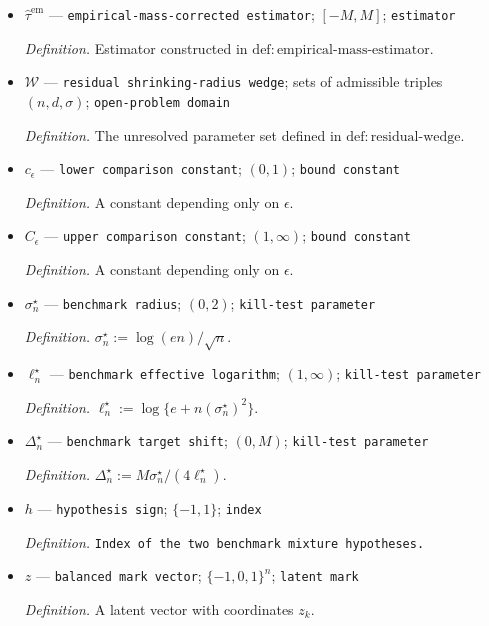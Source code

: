 \documentclass{article}
\begin{document}
\begin{itemize}
  \item \(\widehat\tau^{\mathrm{em}}\) --- \texttt{empirical-\allowbreak{}mass-\allowbreak{}corrected estimator}; \([-M,M]\); \texttt{estimator}
  \par\smallskip\noindent\emph{Definition.} Estimator constructed in \(\mathrm{def:empirical\text{-}mass\text{-}estimator}\).
  \item \(\mathcal W\) --- \texttt{residual shrinking-\allowbreak{}radius wedge}; sets of admissible triples \((n,d,\sigma)\); \texttt{open-\allowbreak{}problem domain}
  \par\smallskip\noindent\emph{Definition.} The unresolved parameter set defined in \(\mathrm{def:residual\text{-}wedge}\).
  \item \(c_{\epsilon}\) --- \texttt{lower comparison constant}; \((0,1)\); \texttt{bound constant}
  \par\smallskip\noindent\emph{Definition.} A constant depending only on \(\epsilon\).
  \item \(C_{\epsilon}\) --- \texttt{upper comparison constant}; \((1,\infty)\); \texttt{bound constant}
  \par\smallskip\noindent\emph{Definition.} A constant depending only on \(\epsilon\).
  \item \(\sigma_n^\star\) --- \texttt{benchmark radius}; \((0,2)\); \texttt{kill-\allowbreak{}test parameter}
  \par\smallskip\noindent\emph{Definition.} \(\sigma_n^\star:=\log(en)/\sqrt n\).
  \item \(\ell_n^\star\) --- \texttt{benchmark effective logarithm}; \((1,\infty)\); \texttt{kill-\allowbreak{}test parameter}
  \par\smallskip\noindent\emph{Definition.} \(\ell_n^\star:=\log\{e+n(\sigma_n^\star)^2\}\).
  \item \(\Delta_n^\star\) --- \texttt{benchmark target shift}; \((0,M)\); \texttt{kill-\allowbreak{}test parameter}
  \par\smallskip\noindent\emph{Definition.} \(\Delta_n^\star:=M\sigma_n^\star/(4\ell_n^\star)\).
  \item \(h\) --- \texttt{hypothesis sign}; \(\{-1,1\}\); \texttt{index}
  \par\smallskip\noindent\emph{Definition.} \texttt{Index of the two benchmark mixture hypotheses.}
  \item \(z\) --- \texttt{balanced mark vector}; \(\{-1,0,1\}^n\); \texttt{latent mark}
  \par\smallskip\noindent\emph{Definition.} A latent vector with coordinates \(z_k\).

\end{itemize}
\end{document}
